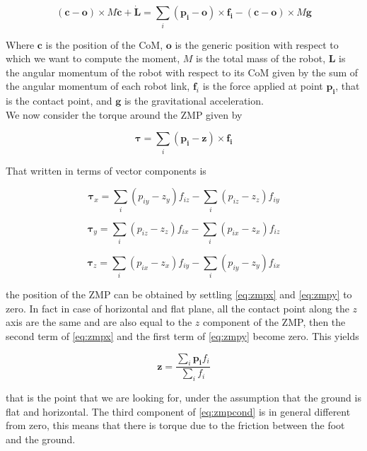 \documentclass[a4paper]{article}
\begin{document}
\begin{equation}
(\pmb{c}-\pmb{o})\times M \ddot{\pmb{c}}+\dot{\pmb{L}} = \sum_i{(\pmb{p_i}-\pmb{o})}\times \pmb{f_i}-(\pmb{c}-\pmb{o})\times M\pmb{g}
\label{eq:eulereq}
\end{equation}   

Where $\pmb{c}$ is the position of the CoM, $\pmb{o}$ is the generic position with respect to which we want to compute the moment, $M$ is the total mass of the robot, $\pmb{L}$ is the angular momentum of the robot with respect to its CoM given by the sum of the angular momentum of each robot link, $\pmb{f}_i$ is the force applied at point $\pmb{p_i}$, that is the contact point, and $\pmb{g}$ is the gravitational acceleration.\\
We now consider the torque around the ZMP given by

\begin{equation}
\pmb{\tau} = \sum_i{(\pmb{p_i}-\pmb{z})}\times \pmb{f_i}
\label{eq:zmpcond}
\end{equation} 

That written in terms of vector components  is 

\begin{equation}
\pmb{\tau}_x = \sum_i{(p_{iy}-z_y)}f_{iz}-\sum_i{(p_{iz}-z_z)}f_{iy}
\label{eq:zmpx}
\end{equation} 

\begin{equation}
\pmb{\tau}_y = \sum_i{(p_{iz}-z_z)}f_{ix}-\sum_i{(p_{ix}-z_x)}f_{iz}
\label{eq:zmpy}
\end{equation} 

\begin{equation}
\pmb{\tau}_z = \sum_i{(p_{ix}-z_x)}f_{iy}-\sum_i{(p_{iy}-z_y)}f_{ix}
\label{eq:zmpz}
\end{equation} 

the position of the ZMP can be obtained by settling \eqref{eq:zmpx} and \eqref{eq:zmpy} to zero. In fact in case of horizontal and flat plane, all the contact point along the $z$ axis are the same and are also equal to the $z$ component of the ZMP, then the second term of \eqref{eq:zmpx} and the first term of \eqref{eq:zmpy} become zero. This yields

\begin{equation}
\pmb{z} = \frac{\sum_i{\pmb{p_i}f_i}}{\sum_if_i}
\label{eq:zmppoint}
\end{equation} 

that is the point that we are looking for, under the assumption that the ground is flat and horizontal. The third component of \eqref{eq:zmpcond} is in general different from zero, this means that there is torque due to the friction between the foot and the ground.
\end{document}
